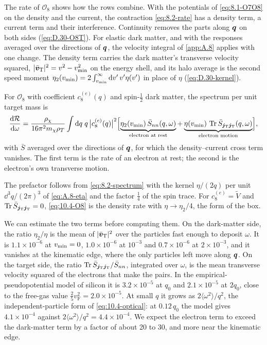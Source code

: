 The rate of $\mathcal{O}_8$ shows how the rows combine. With the potentials of \cref{eq:8.1-O7O8} on the density and the current, the contraction \cref{eq:8.2-rate} has a density term, a current term and their interference. Continuity removes the parts along $\bm{q}$ on both sides (\cref{eq:D.30-O8T}). For elastic dark matter, and with the responses averaged over the directions of $\bm{q}$, the velocity integral of \cref{app:A.8} applies with one change. The density term carries the dark matter's transverse velocity squared, $|\bar{\bm{v}}_{\mathrm{T}}|^2 = v^2 - v_{\mathrm{min}}^2$ on the energy shell, and its halo average is the second speed moment $\eta_2(v_{\mathrm{min}}) = 2\int_{v_{\mathrm{min}}}^\infty\mathrm{d} v'\,v'\eta(v')$ in place of $\eta$ (\cref{eq:D.30-kernel}).
\begin{keyresult}
For $\mathcal{O}_8$ with coefficient $c_8^{(e)}(q)$ and spin-$\frac12$ dark matter, the spectrum per unit target mass is
\begin{equation}
  \frac{\mathrm{d}\mathcal{R}}{\mathrm{d}\omega} = \frac{\rho_\chi}{16\pi^2m_{\chi}\rho_T}\int\mathrm{d} q\;q\,\bigl|c_8^{(e)}(q)\bigr|^2\Bigl[\underbrace{\eta_2(v_{\mathrm{min}})\,\bar S_{nn}(q,\omega)}_{\text{electron at rest}} + \underbrace{\eta(v_{\mathrm{min}})\,\operatorname{Tr}\bar S_{\bm{j}_{\mathrm{T}}\bm{j}_{\mathrm{T}}}(q,\omega)}_{\text{electron motion}}\Bigr] ,
  \label{eq:10.4-O8}
\end{equation}
with $\bar S$ averaged over the directions of $\bm{q}$, for which the density--current cross term vanishes. The first term is the rate of an electron at rest; the second is the electron's own transverse motion.
\end{keyresult}
\noindent The prefactor follows from \cref{eq:8.2-spectrum} with the kernel $\eta/(2q)$ per unit $\dd^3q/(2\pi)^3$ of \cref{eq:A.8-eta} and the factor $\frac14$ of the spin trace. For $c_8^{(e)} = \tilde V$ and $\operatorname{Tr}\bar S_{\bm{j}_{\mathrm{T}}\bm{j}_{\mathrm{T}}} = 0$, \cref{eq:10.4-O8} is the density rate with $\eta \to \eta_2/4$, the form of the box.

We can estimate the two terms before computing them. On the dark-matter side, the ratio $\eta_2/\eta$ is the mean of $|\bar{\bm{v}}_{\mathrm{T}}|^2$ over the particles fast enough to deposit $\omega$. It is $1.1\times10^{-6}$ at $v_{\mathrm{min}} = 0$, $1.0\times10^{-6}$ at $10^{-3}$ and $0.7\times10^{-6}$ at $2\times10^{-3}$, and it vanishes at the kinematic edge, where the only particles left move along $\bm{q}$. On the target side, the ratio $\operatorname{Tr}\bar S_{\bm{j}_{\mathrm{T}}\bm{j}_{\mathrm{T}}}/\bar S_{nn}$, integrated over $\omega$, is the mean transverse velocity squared of the electrons that make the pairs. In the empirical-pseudopotential model of silicon it is $3.2\times10^{-5}$ at $q_0$ and $2.1\times10^{-5}$ at $2q_0$, close to the free-gas value $\frac25v_{\mathrm{F}}^2 = 2.0\times10^{-5}$. At small $q$ it grows as $2\langle\omega^2\rangle/q^2$, the independent-particle form of \cref{eq:10.4-optical}: at $0.12\,q_0$ the model gives $4.1\times10^{-4}$ against $2\langle\omega^2\rangle/q^2 = 4.4\times10^{-4}$. We expect the electron term to exceed the dark-matter term by a factor of about 20 to 30, and more near the kinematic edge.

